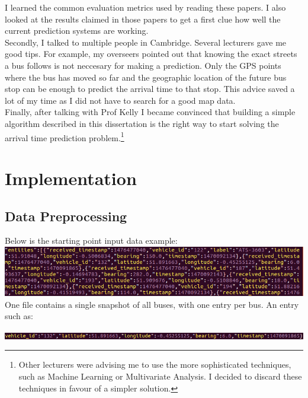 \documentclass[12pt,a4paper,oneside,openright]{report}
\begin{document}
I learned the common evaluation metrics used by reading these papers. I also looked at
the results claimed in those papers to get a first clue how well the current prediction
systems are working. \\

Secondly, I talked to multiple people in Cambridge. Several lecturers gave me good tips.
For example, my overseers pointed out that knowing the exact streets a bus follows is
not neccesary for making a prediction. Only the GPS points where the bus has moved so far
and the geographic location of the future bus stop can be enough to predict the arrival
time to that stop. This advice saved a lot of my time as I did not have to search
for a good map data. \\

Finally, after talking with Prof Kelly I became convinced that building a simple algorithm
described in this dissertation is the right way to start solving the arrival time
prediction problem.\footnote{Other lecturers were advising me to use the more
sophisticated techniques, such as Machine Learning or Multivariate Analysis.
I decided to discard these techniques in favour of a simpler solution.}

\chapter{Implementation}

\section{Data Preprocessing}

Below is the starting point input data example: \\
\includegraphics[width=\textwidth]{figs/starting_data.png} \\

One file contains a single snapshot of all buses, 
with one entry per bus. An entry such as:

\includegraphics[width=\textwidth]{figs/entry.png} \\
\end{document}
